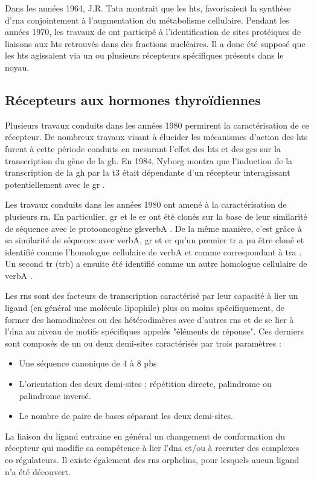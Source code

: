 Dans les années 1964, J.R. Tata montrait que les \glspl{ht}, favorisaient la synthèse d'\gls{rna} conjointement à l'augmentation du métabolisme cellulaire.
Pendant les années 1970, les travaux de \citet{Samuels1973} ont participé à l'identification de sites protéiques de liaisons aux \glspl{ht} retrouvés dans des fractions nucléaires. Il a donc été supposé que les \glspl{ht} agissaient via un ou plusieurs récepteurs spécifiques présents dans le noyau.


\subsection{Récepteurs aux hormones thyroïdiennes}\label{subsubsec:TR}
Plusieurs travaux conduits dans les années 1980 permirent la caractérisation de ce récepteur.
De nombreux travaux visant à élucider les mécanismes d'action des \glspl{ht} furent à cette période conduits en mesurant l'effet des \glspl{ht} et des \glspl{gc} sur la transcription du gène de la \gls{gh}.
En 1984, Nyborg montra que l'induction de la transcription de la \gls{gh} par la \gls{t3} était dépendante d'un récepteur interagissant potentiellement avec le \gls{gr} \citep{Nyborg1984}.

Les travaux conduits dans les années 1980 ont amené à la caractérisation de plusieurs \gls{rn}.
En particulier, \gls{gr} et le \gls{er} ont été clonés sur la base de leur similarité de séquence avec le protooncogène gls{verbA} \citep{Hollenberg1985, Green1986}.
De la même manière, c'est grâce à sa similarité de séquence avec \gls{verbA}, \gls{gr} et \gls{er} qu'un premier \gls{tr} a pu être cloné et identifié comme l'homologue cellulaire de \gls{verbA} et comme correspondant à \gls{tra} \citep{Sap1986,Weinberger1986}.
Un second \gls{tr} (\gls{trb}) a ensuite été identifié comme un autre homologue cellulaire de \gls{verbA} \citep{Thompson1987}.

Les \glspl{rn} sont des facteurs de transcription caractérisé par leur capacité à lier un ligand (en général une molécule lipophile) plus ou moins spécifiquement, de former des homodimères ou des hétérodimères avec d'autres \glspl{rn} et de se lier à l'\gls{dna} au niveau de motifs spécifiques appelés "éléments de réponse".
Ces derniers sont composés de un ou deux demi-sites caractérisés par trois paramètres :
\begin{itemize}
\item Une séquence canonique de 4 à 8 \glspl{pb}
\item L'orientation des deux demi-sites : répétition directe, palindrome ou palindrome inversé.	
\item Le nombre de paire de bases séparant les deux demi-sites.
\end{itemize}	
La liaison du ligand entraine en général un changement de conformation du récepteur qui modifie sa compétence à lier l'\gls{dna} et/ou à recruter des complexes co-régulateurs.
Il existe également des \glspl{rn} orphelins, pour lesquels aucun ligand n'a été découvert.

